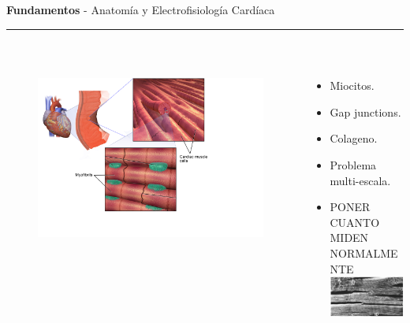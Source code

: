 \documentclass[11pt]{beamer}
\begin{document}
	
	\begin{frame}[t]
		\vspace*{0.5 cm} \textbf{Fundamentos} - Anatomía y Electrofisiología Cardíaca \\
		\color{brown}\rule{\linewidth}{4pt} \\ [0.5 cm]
		\begin{columns}[T] %
			\begin{column}{.48\textwidth}
				\begin{figure}
				\centering
				\includegraphics[height=6.3 cm]{fig/Cardiac_Muscle}
				\end{figure}

			\end{column}%
			\hfill%
			\begin{column}{.48\textwidth}
				\begin{itemize}
					\item Miocitos.
					\item Gap junctions.
					\item Colageno.
					\item Problema multi-escala.
					\item PONER CUANTO MIDEN NORMALMENTE \\[0.5 cm]
					\includegraphics[height=2.5 cm]{fig/myocitos_foto}
				\end{itemize}
			\end{column}%
		\end{columns}	
	\end{frame}
	
\end{document}
